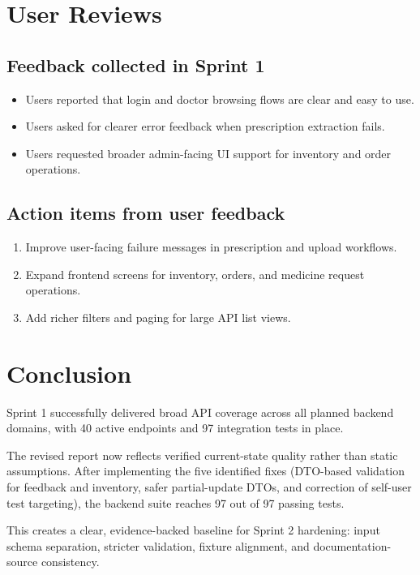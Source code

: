 \documentclass[11pt,a4paper]{article}
\begin{document}
\section{User Reviews}
\subsection{Feedback collected in Sprint 1}
\begin{itemize}[leftmargin=1.2cm]
  \item Users reported that login and doctor browsing flows are clear and easy to use.
  \item Users asked for clearer error feedback when prescription extraction fails.
  \item Users requested broader admin-facing UI support for inventory and order operations.
\end{itemize}

\subsection{Action items from user feedback}
\begin{enumerate}[leftmargin=1.2cm]
  \item Improve user-facing failure messages in prescription and upload workflows.
  \item Expand frontend screens for inventory, orders, and medicine request operations.
  \item Add richer filters and paging for large API list views.
\end{enumerate}

\section{Conclusion}
Sprint 1 successfully delivered broad API coverage across all planned backend domains, with 40 active endpoints and 97 integration tests in place.

The revised report now reflects verified current-state quality rather than static assumptions. After implementing the five identified fixes (DTO-based validation for feedback and inventory, safer partial-update DTOs, and correction of self-user test targeting), the backend suite reaches 97 out of 97 passing tests.

This creates a clear, evidence-backed baseline for Sprint 2 hardening: input schema separation, stricter validation, fixture alignment, and documentation-source consistency.
\end{document}
